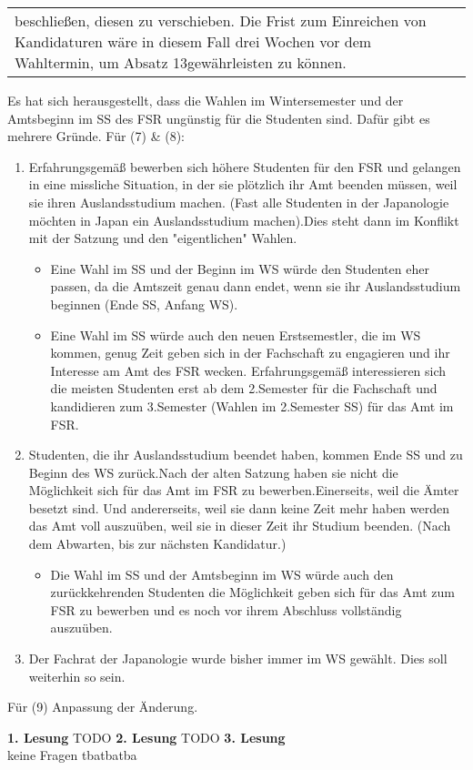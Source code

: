 {\begin{longtable}{|p{7.5cm}|p{7.5cm}|}
        beschließen, diesen zu verschieben. Die Frist zum Einreichen von Kandidaturen wäre in diesem Fall drei Wochen vor dem
        Wahltermin, um Absatz 13gewährleisten zu können.\\
    \end{longtable}
    }{
        Es hat sich herausgestellt, dass die Wahlen im Wintersemester und der Amtsbeginn im SS des FSR ungünstig für die Studenten
        sind. Dafür gibt es mehrere Gründe.\newline
        Für (7) \& (8):
        \begin{enumerate}
            \item Erfahrungsgemäß bewerben sich höhere Studenten für den FSR und gelangen in eine missliche Situation,
            in der sie plötzlich ihr Amt beenden müssen, weil sie ihren Auslandsstudium machen. (Fast alle Studenten in der
            Japanologie möchten in Japan ein Auslandsstudium machen).Dies steht dann im Konflikt mit der Satzung und den 
            "eigentlichen" Wahlen.
            \begin{itemize}
                \item Eine Wahl im SS und der Beginn im WS würde den Studenten eher passen, da die Amtszeit genau dann endet, wenn sie ihr Auslandsstudium beginnen (Ende SS, Anfang WS).
                \item Eine Wahl im SS würde auch den neuen Erstsemestler, die im WS kommen, genug Zeit geben sich in der Fachschaft zu engagieren und ihr Interesse am Amt des FSR wecken. Erfahrungsgemäß interessieren sich die meisten Studenten erst ab dem 2.Semester für die Fachschaft und kandidieren zum 3.Semester (Wahlen im 2.Semester SS) für das Amt im FSR.
            \end{itemize}
            \item Studenten, die ihr Auslandsstudium beendet haben, kommen Ende SS und zu Beginn des WS zurück.Nach der alten Satzung haben sie nicht die Möglichkeit sich für das Amt im FSR zu bewerben.Einerseits, weil die Ämter besetzt sind. Und andererseits, weil sie dann keine Zeit mehr haben werden das Amt voll auszuüben, weil sie in dieser Zeit ihr Studium beenden. (Nach dem Abwarten, bis zur nächsten Kandidatur.)
            \begin{itemize}
                \item Die Wahl im SS und der Amtsbeginn im WS würde auch den zurückkehrenden Studenten die Möglichkeit geben sich für das Amt zum FSR zu bewerben und es noch vor ihrem Abschluss vollständig auszuüben.
            \end{itemize}
            \item Der Fachrat der Japanologie wurde bisher immer im WS gewählt. Dies soll weiterhin so sein.
        \end{enumerate}
        Für (9) Anpassung der Änderung.
    }{
        \textbf{1. Lesung}
        TODO
        \textbf{2. Lesung}
        TODO
        \textbf{3. Lesung}\\
        keine Fragen
    }{tba}{tba}{tba}
